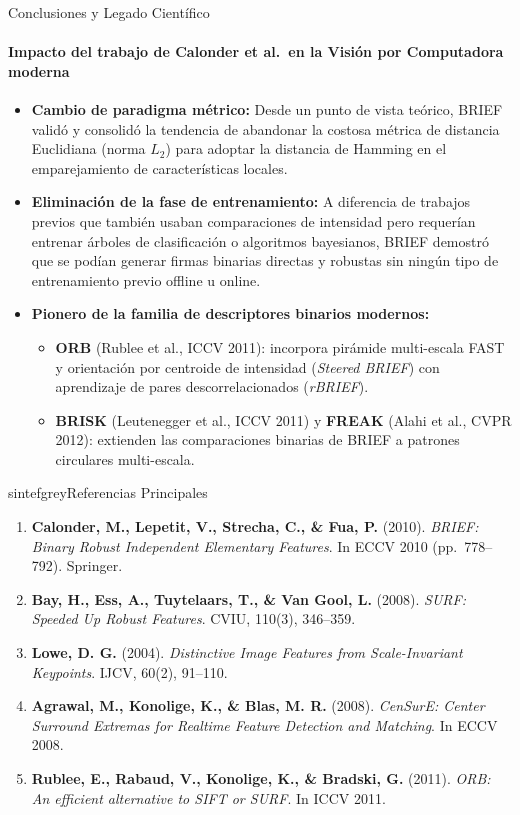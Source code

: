 \documentclass{beamer}
\begin{document}
\footlinecolor{}

\begin{frame}{Conclusiones y Legado Científico}
\framesubtitle{Impacto del trabajo de Calonder et al.\ en la Visión por Computadora moderna}
\scriptsize
\begin{itemize}\setlength{\itemsep}{3pt}
    \item \textbf{Cambio de paradigma métrico:} Desde un punto de vista teórico, BRIEF validó y consolidó la tendencia de abandonar la costosa métrica de distancia Euclidiana (norma $L_2$) para adoptar la distancia de Hamming en el emparejamiento de características locales.
    \item \textbf{Eliminación de la fase de entrenamiento:} A diferencia de trabajos previos que también usaban comparaciones de intensidad pero requerían entrenar árboles de clasificación o algoritmos bayesianos, BRIEF demostró que se podían generar firmas binarias directas y robustas sin ningún tipo de entrenamiento previo offline u online.
    \item \textbf{Pionero de la familia de descriptores binarios modernos:}
    \begin{itemize}\scriptsize
        \item \textbf{ORB} (Rublee et al., ICCV 2011): incorpora pirámide multi-escala FAST y orientación por centroide de intensidad (\emph{Steered BRIEF}) con aprendizaje de pares descorrelacionados (\emph{rBRIEF}).
        \item \textbf{BRISK} (Leutenegger et al., ICCV 2011) y \textbf{FREAK} (Alahi et al., CVPR 2012): extienden las comparaciones binarias de BRIEF a patrones circulares multi-escala.
    \end{itemize}
\end{itemize}

\vspace{0.1cm}
\begin{colorblock}[black]{sintefgrey}{Referencias Principales}
\tiny
\begin{enumerate}\setlength{\itemsep}{1pt}
    \item \textbf{Calonder, M., Lepetit, V., Strecha, C., \& Fua, P.} (2010). \emph{BRIEF: Binary Robust Independent Elementary Features}. In ECCV 2010 (pp.\ 778--792). Springer.
    \item \textbf{Bay, H., Ess, A., Tuytelaars, T., \& Van Gool, L.} (2008). \emph{SURF: Speeded Up Robust Features}. CVIU, 110(3), 346--359.
    \item \textbf{Lowe, D. G.} (2004). \emph{Distinctive Image Features from Scale-Invariant Keypoints}. IJCV, 60(2), 91--110.
    \item \textbf{Agrawal, M., Konolige, K., \& Blas, M. R.} (2008). \emph{CenSurE: Center Surround Extremas for Realtime Feature Detection and Matching}. In ECCV 2008.
    \item \textbf{Rublee, E., Rabaud, V., Konolige, K., \& Bradski, G.} (2011). \emph{ORB: An efficient alternative to SIFT or SURF}. In ICCV 2011.
\end{enumerate}
\end{colorblock}
\end{frame}
\end{document}
